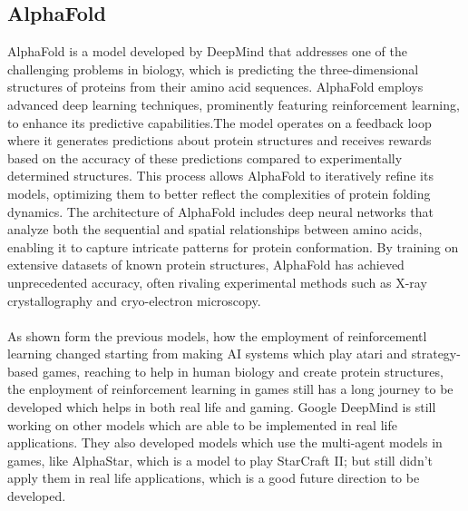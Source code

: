 \subsection*{AlphaFold}
AlphaFold is a model developed by DeepMind that addresses one of the
challenging problems in biology, which is predicting the three-dimensional
structures of proteins from their amino acid sequences. AlphaFold employs
advanced deep learning techniques, prominently featuring reinforcement
learning, to enhance its predictive capabilities.The model operates on a
feedback loop where it generates predictions about protein structures and
receives rewards based on the accuracy of these predictions compared to
experimentally determined structures. This process allows AlphaFold to
iteratively refine its models, optimizing them to better reflect the
complexities of protein folding dynamics. The architecture of AlphaFold
includes deep neural networks that analyze both the sequential and spatial
relationships between amino acids, enabling it to capture intricate patterns
for protein conformation. By training on extensive datasets of known protein
structures, AlphaFold has achieved unprecedented accuracy, often rivaling
experimental methods such as X-ray crystallography and cryo-electron
microscopy\cite{FD2}.\\\\ As shown form the previous models, how the employment
of reinforcementl learning changed starting from making AI systems which play
atari and strategy-based games, reaching to help in human biology and create
protein structures, the enployment of reinforcement learning in games still has
a long journey to be developed which helps in both real life and gaming. Google
DeepMind is still working on other models which are able to be implemented in
real life applications. They also developed models which use the multi-agent
models in games, like AlphaStar, which is a model to play StarCraft II; but
still didn't apply them in real life applications, which is a good future
direction to be developed.